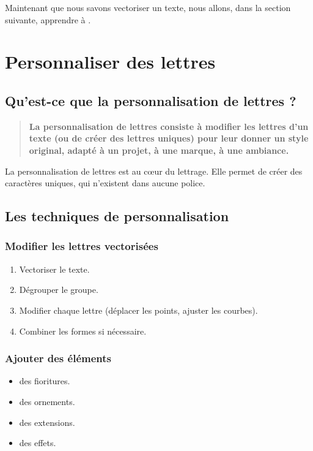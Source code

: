 Maintenant que nous savons vectoriser un texte, nous allons, dans la section suivante, apprendre à .

\section{Personnaliser des lettres}

\subsection{Qu'est-ce que la personnalisation de lettres ?}

\begin{quote}
\textbf{La personnalisation de lettres consiste à modifier les lettres d'un texte (ou de créer des lettres uniques) pour leur donner un style original, adapté à un projet, à une marque, à une ambiance.}
\end{quote}

La personnalisation de lettres est au cœur du lettrage. Elle permet de créer des caractères uniques, qui n'existent dans aucune police.

\subsection{Les techniques de personnalisation}

\subsubsection{Modifier les lettres vectorisées}

\begin{enumerate}
    \item Vectoriser le texte.
    \item Dégrouper le groupe.
    \item Modifier chaque lettre (déplacer les points, ajuster les courbes).
    \item Combiner les formes si nécessaire.
\end{enumerate}

\subsubsection{Ajouter des éléments}

\begin{itemize}
    \item {} des fioritures.
    \item {} des ornements.
    \item {} des extensions.
    \item {} des effets.
\end{itemize}


